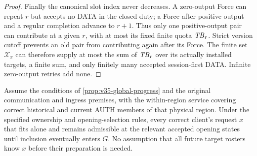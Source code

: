 \begin{proof}
Finally the canonical slot index never decreases. A zero-output Force
can repeat $r$ but accepts no DATA in the closed duty; a Force after
positive output and a regular completion advance to $r+1$. Thus only
one positive-output pair can contribute at a given $r$, with at most
its fixed finite quota $\mathit{TB}_r$. Strict version cutoff prevents an old
pair from contributing again after its Force. The finite set
$\mathcal X_x$ can therefore supply at most the sum of $\mathit{TB}_r$ over
its actually installed targets, a finite sum, and only finitely many
accepted session-first DATA. Infinite zero-output retries add none.
\end{proof}

\begin{proposition}
\label{prop:v310-request-progress}
Assume the conditions of \cref{prop:v35-global-progress} and the
original communication and ingress premises, with the within-region
service covering correct historical and current AUTH members of that
physical region. Under the specified ownership and opening-selection
rules, every correct client's request $x$ that fits alone and remains
admissible at the relevant accepted opening states until inclusion
eventually enters $G$. No assumption that all future target rosters
know $x$ before their preparation is needed.
\end{proposition}
